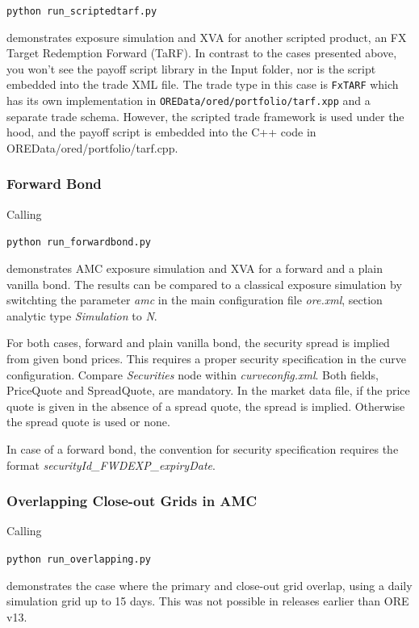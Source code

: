 \medskip
\centerline {\tt python run\_scriptedtarf.py} 

\medskip
demonstrates exposure simulation and XVA for another scripted product, an
FX Target Redemption Forward (TaRF). In contrast to the cases presented above, you won't see
the payoff script library in the Input folder, nor is the script embedded into the trade XML file.
The trade type in this case is {\tt FxTARF} which has its own implementation in {\tt OREData/ored/portfolio/tarf.xpp}
and a separate trade schema. However, the scripted trade framework is used under the hood, and the payoff
script is embedded into the C++ code in OREData/ored/portfolio/tarf.cpp.

\subsubsection{Forward Bond}

Calling 

\medskip
\centerline {\tt python run\_forwardbond.py} 

\medskip
demonstrates AMC exposure simulation and XVA for a forward and a plain vanilla bond.
The results can be compared to a classical exposure simulation by switchting the parameter \emph{amc} in the
main configuration file \emph{ore.xml}, section analytic type \emph{Simulation} to \emph{N}.

For both cases, forward and plain vanilla bond, the security spread is implied from given bond prices.
This requires a proper security specification in the curve configuration. Compare \emph{Securities} node
within \emph{curveconfig.xml}. Both fields, PriceQuote and SpreadQuote, are mandatory. In the market data file,
if the price quote is given in the absence of a spread quote, the spread is implied.
Otherwise the spread quote is used or none.

In case of a forward bond, the convention for security specification requires the format \emph{securityId\_FWDEXP\_expiryDate}.

\subsubsection{Overlapping Close-out Grids in AMC}

Calling 

\medskip
\centerline {\tt python run\_overlapping.py} 

\medskip
demonstrates the case where the primary and close-out grid overlap, using
a daily simulation grid up to 15 days. This was not possible in releases earlier than ORE v13.

